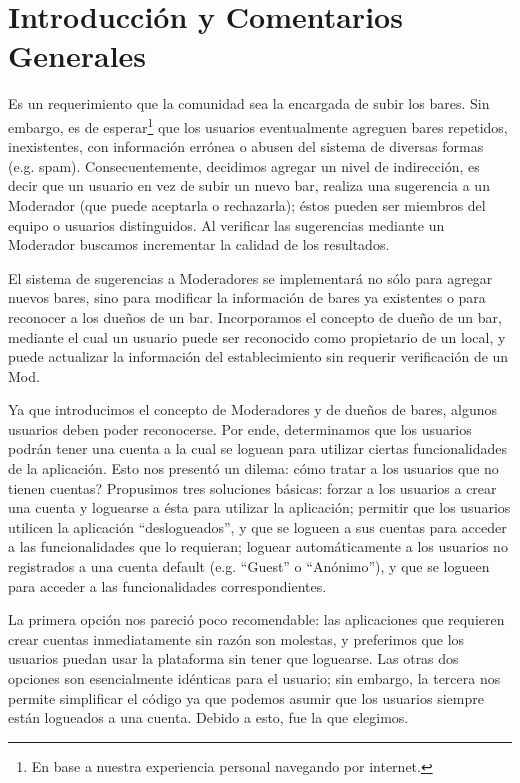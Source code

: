 \documentclass[hidelinks,a4paper,11pt, nofootinbib]{article}
\begin{document}
\maketitle

\section{Introducción y Comentarios Generales}

\par Es un requerimiento que la comunidad sea la encargada de subir los bares. 
Sin embargo, es de esperar\footnote{En base a nuestra experiencia personal navegando por internet.} que los usuarios eventualmente agreguen bares repetidos, inexistentes, con información errónea o abusen del sistema de diversas formas (e.g. spam).
Consecuentemente, decidimos agregar un nivel de indirección, es decir que un usuario en vez de subir un nuevo bar, realiza una sugerencia a un Moderador (que puede aceptarla o rechazarla); éstos pueden ser miembros del equipo o usuarios distinguidos. 
Al verificar las sugerencias mediante un Moderador buscamos incrementar la calidad de los resultados.

\par El sistema de sugerencias a Moderadores se implementará no sólo para agregar nuevos bares, sino para modificar la información de bares ya existentes o para reconocer a los dueños de un bar.
Incorporamos el concepto de dueño de un bar, mediante el cual un usuario puede ser reconocido como propietario de un local, y puede actualizar la información del establecimiento sin requerir verificación de un Mod.

\par Ya que introducimos el concepto de Moderadores y de dueños de bares, algunos usuarios deben poder reconocerse.
Por ende, determinamos que los usuarios podrán tener una cuenta a la cual se loguean para utilizar ciertas funcionalidades de la aplicación.
Esto nos presentó un dilema: cómo tratar a los usuarios que no tienen cuentas?
Propusimos tres soluciones básicas: forzar a los usuarios a crear una cuenta y loguearse a ésta para utilizar la aplicación; permitir que los usuarios utilicen la aplicación ``deslogueados'', y que se logueen a sus cuentas para acceder a las funcionalidades que lo requieran; loguear automáticamente a los usuarios no registrados a una cuenta default (e.g. ``Guest'' o ``Anónimo''), y que se logueen para acceder a las funcionalidades correspondientes.

\par La primera opción nos pareció poco recomendable: las aplicaciones que requieren crear cuentas inmediatamente sin razón son molestas, y preferimos que los usuarios puedan usar la plataforma sin tener que loguearse.
Las otras dos opciones son esencialmente idénticas para el usuario; sin embargo, la tercera nos permite simplificar el código ya que podemos asumir que los usuarios siempre están logueados a una cuenta. 
Debido a esto, fue la que elegimos.
\end{document}
